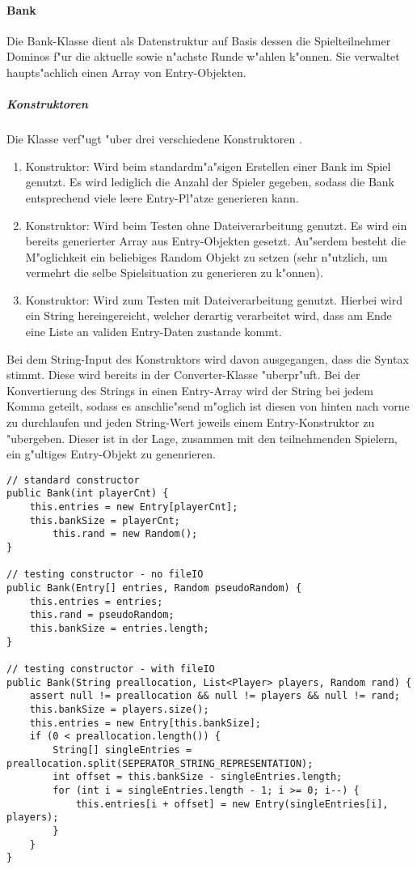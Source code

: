 \paragraph{Bank}
\label{par:bank}
Die Bank-Klasse dient als Datenstruktur auf Basis dessen die Spielteilnehmer Dominos f"ur die aktuelle sowie n"achste Runde w"ahlen k"onnen. Sie verwaltet haupts"achlich einen Array von Entry-Objekten. 

\subparagraph{Konstruktoren}
Die Klasse verf"ugt "uber drei verschiedene Konstruktoren .
\begin{enumerate}
	\item Konstruktor: Wird beim standardm"a"sigen Erstellen einer Bank im Spiel genutzt. Es wird lediglich die Anzahl der Spieler gegeben, sodass die Bank entsprechend viele leere Entry-Pl"atze generieren kann. 
	\item Konstruktor: Wird beim Testen ohne Dateiverarbeitung genutzt. Es wird ein bereits generierter Array aus Entry-Objekten gesetzt. Au"serdem besteht die M"oglichkeit ein beliebiges Random Objekt zu setzen (sehr n"utzlich, um vermehrt die selbe Spielsituation zu generieren zu k"onnen). 
	\item Konstruktor: Wird zum Testen mit Dateiverarbeitung genutzt. Hierbei wird ein String hereingereicht, welcher derartig verarbeitet wird, dass am Ende eine Liste an validen Entry-Daten zustande kommt. 
\end{enumerate}
Bei dem String-Input des Konstruktors wird davon ausgegangen, dass die Syntax stimmt. Diese wird bereits in der Converter-Klasse "uberpr"uft. Bei der Konvertierung des Strings in einen Entry-Array wird der String bei jedem Komma geteilt, sodass es anschlie"send m"oglich ist diesen von hinten nach vorne zu durchlaufen und jeden String-Wert jeweils einem Entry-Konstruktor zu "ubergeben. Dieser ist in der Lage, zusammen mit den teilnehmenden Spielern, ein g"ultiges Entry-Objekt zu genenrieren. 
\begin{lstlisting}[style=CodeHighlighting,float,caption=Bank - Konstruktor,label=lst:bank_konstruktor]
// standard constructor 
public Bank(int playerCnt) {
    this.entries = new Entry[playerCnt];
    this.bankSize = playerCnt;
        this.rand = new Random();
}

// testing constructor - no fileIO
public Bank(Entry[] entries, Random pseudoRandom) {
    this.entries = entries;
    this.rand = pseudoRandom;
    this.bankSize = entries.length;
}

// testing constructor - with fileIO
public Bank(String preallocation, List<Player> players, Random rand) {
    assert null != preallocation && null != players && null != rand;
    this.bankSize = players.size();
    this.entries = new Entry[this.bankSize];
    if (0 < preallocation.length()) {
        String[] singleEntries = preallocation.split(SEPERATOR_STRING_REPRESENTATION);
        int offset = this.bankSize - singleEntries.length;
        for (int i = singleEntries.length - 1; i >= 0; i--) {
            this.entries[i + offset] = new Entry(singleEntries[i], players);
        }
    }
}
\end{lstlisting}

